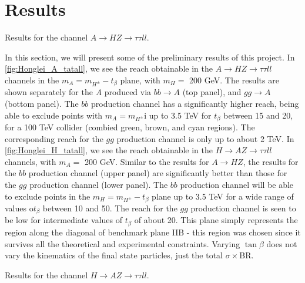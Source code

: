 {\section{Results}
\begin{marginfigure}
\centering
\caption{Results for the channel $A\rightarrow HZ\rightarrow \tau\tau ll$.}
\label{fig:Honglei_A_tatall}
\end{marginfigure}
In this section, we will present some of the preliminary results of this project. In \autoref{fig:Honglei_A_tatall}, we see the reach obtainable in the $A\rightarrow HZ\rightarrow \tau\tau ll$ channels in the $m_A = m_{H^\pm} - t_\beta$ plane, with $m_H = $ 200 GeV. The results are shown separately for the \emph{A} produced via $bb\rightarrow A$ (top panel), and $gg\rightarrow A$ (bottom panel). The $bb$ production channel has a significantly higher reach, being able to exclude points with $m_A = m_{H^\pm}$i up to 3.5 TeV for $t_\beta$ between 15 and 20, for a 100 TeV collider (combied green, brown, and cyan regions). The corresponding reach for the $gg$ production channel is only up to about 2 TeV. In \autoref{fig:Honglei_H_tatall}, we see the reach obtainable in the $H\rightarrow AZ\rightarrow \tau\tau ll$ channels, with $m_A =$ 200 GeV. Similar to the results for $A\rightarrow HZ$, the results for the $bb$ production channel (upper panel) are significantly better than those for the $gg$ production channel (lower panel). The $bb$ production channel will be able to exclude points in the $m_H = m_{H^\pm} - t_\beta$ plane up to 3.5 TeV for a wide range of values o$t_\beta$ between 10 and 50. The reach for the $gg$ production channel is seen to be low for intermediate values of $t_\beta$ of about 20. This plane simply represents the region along the diagonal of benchmark plane IIB - this region was chosen since it survives all the theoretical and experimental constraints. Varying $\tan\beta$ does not vary the kinematics of the final state particles, just the total $\sigma\times$BR. 
\begin{marginfigure}
\caption{Results for the channel $H\rightarrow AZ\rightarrow \tau\tau ll$.}
\label{fig:Honglei_H_tatall}
\end{marginfigure}

}
